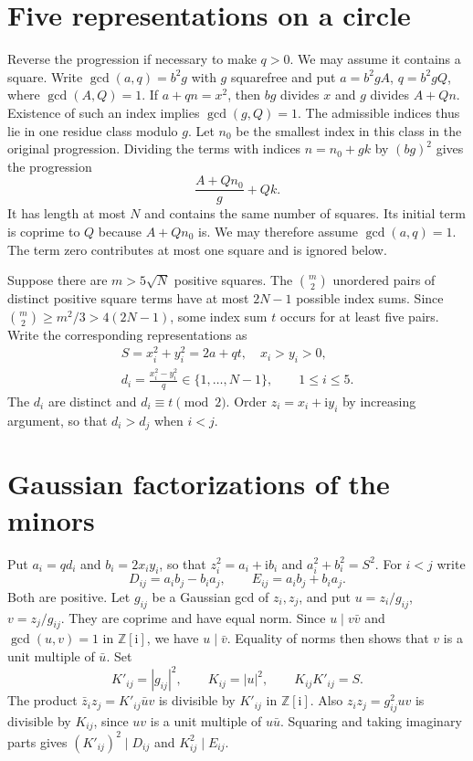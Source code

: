 \documentclass[11pt,reqno]{amsart}
\newcommand{\ii}{\mathrm{i}}
\newcommand{\Z}{\mathbb{Z}}
\begin{document}
\section{Five representations on a circle}

Reverse the progression if necessary to make $q>0$. We may assume it
contains a square. Write $\gcd(a,q)=b^2g$ with $g$ squarefree and put
$a=b^2g A$, $q=b^2g Q$, where $\gcd(A,Q)=1$.
If $a+qn=x^2$, then $bg$ divides $x$ and $g$ divides $A+Qn$.
Existence of such an index implies $\gcd(g,Q)=1$. The admissible indices
thus lie in one residue class modulo $g$. Let $n_0$ be the smallest
index in this class in the original progression. Dividing the terms
with indices $n=n_0+gk$ by $(bg)^2$ gives the progression
\[
 \frac{A+Qn_0}{g}+Qk.
\]
It has length at most $N$ and contains the same number of squares.
Its initial term is coprime to $Q$ because $A+Qn_0$ is. We may therefore assume
$\gcd(a,q)=1$. The term zero contributes at most one square and is
ignored below.

Suppose there are $m>5\sqrt N$ positive squares. The $\binom m2$ unordered
pairs of distinct positive square terms have at most $2N-1$ possible
index sums. Since $\binom m2\ge m^2/3>4(2N-1)$, some index sum $t$
occurs for at least five pairs.
Write the corresponding representations as
\begin{equation}\label{eq:circle}
 \begin{gathered}
 S=x_i^2+y_i^2=2a+qt,\quad x_i>y_i>0,
 \\
 d_i=\frac{x_i^2-y_i^2}{q}\in\{1,\ldots,N-1\},
 \qquad 1\le i\le5.
 \end{gathered}
\end{equation}
The $d_i$ are distinct and $d_i\equiv t\pmod 2$.
Order $z_i=x_i+\ii y_i$ by increasing argument, so that $d_i>d_j$
when $i<j$.

\section{Gaussian factorizations of the minors}

Put $a_i=qd_i$ and $b_i=2x_i y_i$, so that $z_i^2=a_i+\ii b_i$ and
$a_i^2+b_i^2=S^2$. For $i<j$ write
\[
 D_{ij}=a_i b_j-b_i a_j,\qquad E_{ij}=a_i b_j+b_i a_j.
\]
Both are positive. Let $g_{ij}$ be a Gaussian gcd of $z_i,z_j$, and put
$u=z_i/g_{ij}$, $v=z_j/g_{ij}$. They are coprime and have equal norm.
Since $u\mid v\bar v$ and $\gcd(u,v)=1$ in $\Z[\ii]$, we have
$u\mid\bar v$. Equality of norms then shows that $v$ is a unit
multiple of $\bar u$.
Set
\[
 K'_{ij}=|g_{ij}|^2,\qquad K_{ij}=|u|^2,\qquad K_{ij}K'_{ij}=S .
\]
The product $\bar z_i z_j=K'_{ij}\bar u v$ is divisible by $K'_{ij}$
in $\Z[\ii]$. Also $z_i z_j=g_{ij}^2uv$ is divisible by $K_{ij}$,
since $uv$ is a unit multiple of $u\bar u$. Squaring and taking
imaginary parts gives $(K'_{ij})^2\mid D_{ij}$ and $K_{ij}^2\mid E_{ij}$.
\end{document}
